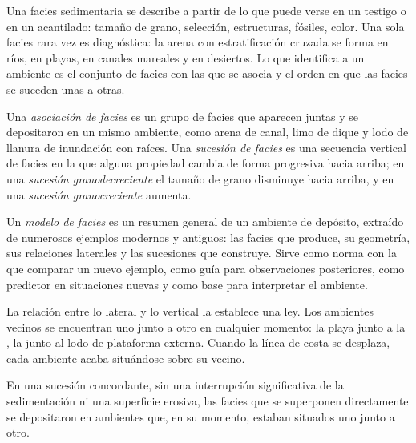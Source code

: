 Una facies sedimentaria se describe a partir de lo que puede verse en un testigo o en
un acantilado: tamaño de grano, selección, estructuras, fósiles, color. Una sola facies
rara vez es diagnóstica: la arena con estratificación cruzada se forma en ríos, en playas,
en canales mareales y en desiertos. Lo que identifica a un ambiente es el conjunto de
facies con las que se asocia y el orden en que las facies se suceden unas a otras.

\begin{definition}\label{def:b3:facies-models:association}
Una \emph{asociación de facies} es un grupo de facies
que aparecen juntas y se depositaron en un mismo ambiente, como arena de canal,
limo de dique y lodo de llanura de inundación con raíces. Una \emph{sucesión de
facies} es una secuencia vertical de facies en la que
alguna propiedad cambia de forma progresiva hacia arriba; en una \emph{sucesión
granodecreciente} el tamaño de grano disminuye hacia arriba,
y en una \emph{sucesión granocreciente}
aumenta.
\end{definition}

\begin{definition}\label{def:b3:facies-models:model}
Un \emph{modelo de facies} es un resumen general de un ambiente
de depósito, extraído de numerosos ejemplos modernos y antiguos: las facies que produce,
su geometría, sus relaciones laterales y las sucesiones que construye. Sirve como norma
con la que comparar un nuevo ejemplo, como
guía para observaciones posteriores, como predictor en situaciones nuevas y como base para
interpretar el ambiente.
\end{definition}

La relación entre lo lateral y lo vertical la establece una ley. Los ambientes vecinos
se encuentran uno junto a otro en cualquier momento: la playa junto a la , la
 junto al lodo de plataforma externa. Cuando la línea de costa se desplaza,
cada ambiente acaba situándose sobre su vecino.

\begin{theorem}\label{thm:b3:facies-models:walther}
En una sucesión concordante, sin una interrupción significativa de la sedimentación ni una
superficie erosiva, las facies que se superponen directamente se depositaron en ambientes
que, en su momento, estaban situados uno junto a otro.
\end{theorem}


